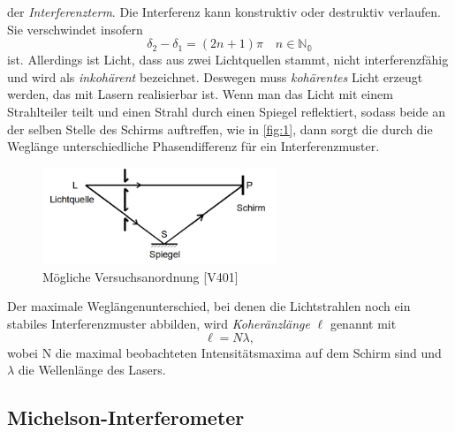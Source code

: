 der \textit{Interferenzterm}.
Die Interferenz kann konstruktiv oder destruktiv verlaufen. Sie verschwindet insofern 
\begin{equation}
  \delta_{2}-\delta_{1}=(2n+1)\pi \quad n \in \mathds{N_{0}} \nonumber
\end{equation}
ist. Allerdings ist Licht, dass aus zwei Lichtquellen stammt, nicht interferenzfähig und wird als \textit{inkohärent} bezeichnet. Deswegen muss \textit{kohärentes} Licht erzeugt werden, das mit Lasern realisierbar ist.
Wenn man das Licht mit einem Strahlteiler teilt und einen Strahl durch einen Spiegel reflektiert, sodass beide an der selben Stelle des Schirms auftreffen, wie in \autoref{fig:1}, dann sorgt die durch die Weglänge unterschiedliche Phasendifferenz für ein Interferenzmuster.
\begin{figure}[H]
  \centering
  \includegraphics[width=7cm]{1}
  \caption{Mögliche Versuchsanordnung [V401]}
  \label{fig:1}
\end{figure}
Der maximale Weglängenunterschied, bei denen die Lichtstrahlen noch ein stabiles Interferenzmuster abbilden, wird \textit{Koheränzlänge} $\ell$ genannt mit
\begin{equation}
  \ell=N\lambda, \nonumber
\end{equation}
wobei N die maximal beobachteten Intensitätsmaxima auf dem Schirm sind und $\lambda$ die Wellenlänge des Lasers.

\subsection{Michelson-Interferometer}

